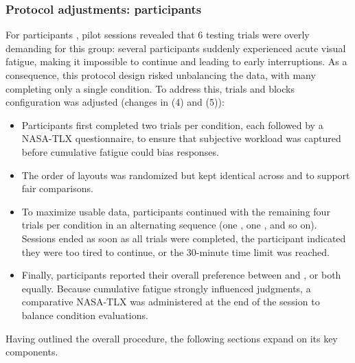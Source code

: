 \subsubsection{Protocol adjustments: participants \LV}
\label{sec:protocole-adjustements-lv}
For participants \LV, pilot sessions revealed that 6 testing trials were overly demanding for this group: several participants suddenly experienced acute visual fatigue, making it impossible to continue and leading to early interruptions. As a consequence, this protocol design risked unbalancing the data, with many completing only a single condition. To address this, trials and blocks configuration was adjusted (changes in  (4) and (5)):
\begin{itemize}
    \item Participants first completed two trials per condition, each followed by a NASA-TLX questionnaire, to ensure that subjective workload was captured before cumulative fatigue could bias responses.
    \item The order of layouts was randomized but kept identical across \condonenot and \condtwonot to support fair comparisons.
    \item To maximize usable data, participants continued with the remaining four trials per condition in an alternating sequence (one \condonenot, one \condtwonot, and so on). Sessions ended as soon as all trials were completed, the participant indicated they were too tired to continue, or the 30-minute time limit was reached.
    \item Finally, participants reported their overall preference between \condonenot and \condtwonot, or both equally. Because cumulative fatigue strongly influenced judgments, a comparative NASA-TLX was administered at the end of the session to balance condition evaluations.
\end{itemize} 

Having outlined the overall procedure, the following sections expand on its key components.



